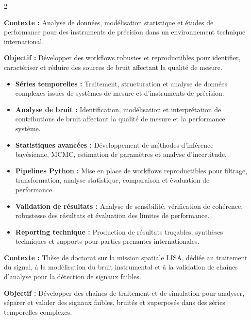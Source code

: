 \documentclass[8pt,a4paper,ragged2e,withhyper]{../_shared/altacv}
\begin{document}
\begin{paracol}{2}
\divider


\textbf{Contexte :} Analyse de données, modélisation statistique et études de performance pour des instruments de précision dans un environnement technique international.

\textbf{Objectif :} Développer des workflows robustes et reproductibles pour identifier, caractériser et réduire des sources de bruit affectant la qualité de mesure.

\begin{itemize}
  \item \textbf{Séries temporelles :} Traitement, structuration et analyse de données complexes issues de systèmes de mesure et d’instruments de précision.
  \item \textbf{Analyse de bruit :} Identification, modélisation et interprétation de contributions de bruit affectant la qualité de mesure et la performance système.
  \item \textbf{Statistiques avancées :} Développement de méthodes d’inférence bayésienne, MCMC, estimation de paramètres et analyse d’incertitude.
  \item \textbf{Pipelines Python :} Mise en place de workflows reproductibles pour filtrage, transformation, analyse statistique, comparaison et évaluation de performance.
  \item \textbf{Validation de résultats :} Analyse de sensibilité, vérification de cohérence, robustesse des résultats et évaluation des limites de performance.
  \item \textbf{Reporting technique :} Production de résultats traçables, synthèses techniques et supports pour parties prenantes internationales.
\end{itemize}

\divider


\textbf{Contexte :} Thèse de doctorat sur la mission spatiale LISA, dédiée au traitement du signal, à la modélisation du bruit instrumental et à la validation de chaînes d’analyse pour la détection de signaux faibles.

\textbf{Objectif :} Développer des chaînes de traitement et de simulation pour analyser, séparer et valider des signaux faibles, bruités et superposés dans des séries temporelles complexes.


\end{paracol}
\end{document}
